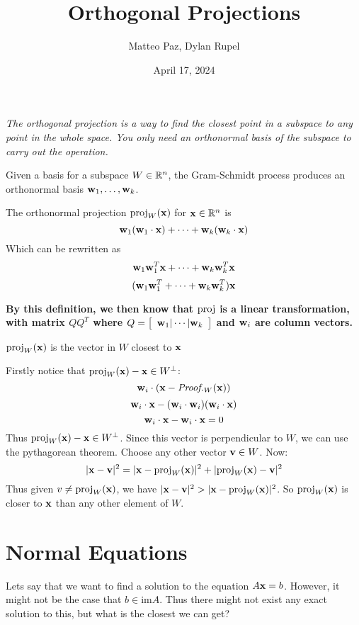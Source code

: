 \documentclass{article}
\author{Matteo Paz, Dylan Rupel}
\date{April 17, 2024}
\title{Orthogonal Projections}
\newcommand{\pj}{\text{\normalfont proj}}
\begin{document}
    \maketitle{}
    \noindent

    \emph{The orthogonal projection is a way to find the closest point in a subspace to any point in the whole space. You only need an orthonormal basis of the subspace to carry out the operation.} \vspace{1.5em}

    Given a basis for a subspace $W \in \mathbb{R}^n$, the Gram-Schmidt process produces an orthonormal basis $\mathbf{w}_1, \ldots, \mathbf{w}_k$.

    \begin{definition}
        The orthonormal projection $\pj_W(\bfx)$ for $\mathbf{x} \in \mathbb{R}^n$ is
        \[\mathbf{w}_1(\mathbf{w}_1 \cdot \mathbf{x}) + \cdots + \mathbf{w}_k(\mathbf{w}_k \cdot \mathbf{x})\]
        Which can be rewritten as
        \[\mathbf{w}_1\mathbf{w}_1^T \mathbf{x} + \cdots + \mathbf{w}_k\mathbf{w}_k^T\mathbf{x}\]
        \[(\mathbf{w}_1\mathbf{w}_1^T + \cdots + \mathbf{w}_k\mathbf{w}_k^T)\mathbf{x}\]
    \end{definition}

\textbf{By this definition, we then know that $\pj$ is a linear transformation, with matrix $QQ^T$ where $Q = \left[\begin{array}{c}\mathbf{w}_1 | \cdots | \mathbf{w}_k\end{array}\right]$ and $\mathbf{w}_i$ are column vectors.}

\begin{proposition}
    $\pj_W(\bfx)$ is the vector in $W$ closest to $\mathbf{x}$
\end{proposition}
\pf Firstly notice that $\pj_W(\bfx) - \bfx \in W^\perp$:
\[\bfw_i \cdot (\bfx - \pf_W(\bfx))\]
\[\mathbf{w}_i \cdot \mathbf{x} - (\mathbf{w}_i \cdot \mathbf{w}_i)(\mathbf{w}_i \cdot \mathbf{x})\]
\[\mathbf{w}_i \cdot \mathbf{x} - \mathbf{w}_i \cdot \mathbf{x} = 0\]
Thus $\pj_W(\bfx) - \bfx \in W^\perp$.
Since this vector is perpendicular to $W$, we can use the pythagorean theorem. Choose any other vector $\mathbf{v} \in W$. Now:
\[|\bfx - \bfv|^2 = |\bfx - \pj_W(\bfx)|^2 + |\pj_W(\bfx) - \bfv|^2\]
Thus given $v \not = \pj_W(\bfx)$, we have $|\bfx-\bfv|^2 > |\bfx - \pj_W(\bfx)|^2$. So $\pj_W(\bfx)$ is closer to $\mathbf{x}$ than any other element of $W$.

\section*{Normal Equations}

Lets say that we want to find a solution to the equation $A\mathbf{x} = b$. However, it might not be the case that $b \in \text{im} A$. Thus there might not exist any exact solution to this, but what is the closest we can get? \\
\end{document}

